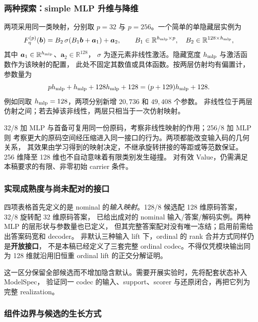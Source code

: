 \documentclass[11pt,UTF8,fontset=fandol]{ctexart}
\numberwithin{equation}{section}
\theoremstyle{definition}
\newcommand{\R}{\mathbb R}
\begin{document}
\subsubsection{两种探索：simple MLP 升维与降维}

两项采用同一类映射，分别取 $p=32$ 与 $p=256$。一个简单的单隐藏层实例为
\begin{equation}
 F_\eta^{(p)}(\bm b)=B_2\,\sigma(B_1\bm b+\bm a_1)+\bm a_2,
 \qquad
 B_1\in\R^{h_{\rm mlp}\times p},\quad
 B_2\in\R^{128\times h_{\rm mlp}},
 \label{eq:alt:categorical-mlp}
\end{equation}
其中 $\bm a_1\in\R^{h_{\rm mlp}}$、$\bm a_2\in\R^{128}$，
$\sigma$ 为逐元素非线性激活。隐藏宽度 $h_{\rm mlp}$ 与激活函数作为该映射的配置，
此处不固定其数值或具体函数。按两层仿射均有偏置计，参数量为
\begin{equation}
 p h_{\rm mlp}+h_{\rm mlp}+128h_{\rm mlp}+128
 =(p+129)h_{\rm mlp}+128.
 \label{eq:alt:categorical-mlp-parameters}
\end{equation}
例如同取 $h_{\rm mlp}=128$，两项分别新增 $20{,}736$ 和 $49{,}408$ 个参数。
非线性位于两层仿射之间；若去掉该非线性，两层只相当于一次仿射映射。

32/8 加 MLP 与首备可复用同一份原码，考察非线性映射的作用；256/8 加 MLP 则
考察更大的原码空间经压缩进入同一接口的行为。两项都能改变输入码的几何关系，
其效果由学习得到的映射决定，不继承旋转拼接的等距或等范数保证。
256 维降至 128 维也不自动意味着有限类别发生碰撞。
对有效 Value，仍需满足本稿要求的有限、非零初始 carrier 条件。

\subsubsection{实现成熟度与尚未配对的接口}
四项表格首先定义的是 nominal 的\emph{输入映射}。128/8 候选配 128 维原码答案，32/8 旋转配 32 维原码答案，
已给出成对的 nominal 输入/答案/解码实例。两种 MLP 的层形状与参数量也已定义，
但其完整答案配对没有唯一冻结；启用前需给出答案码宽和 decoder。
非默认三种输入 lift 下，ordinal 的 rank 合并方式同样仍是\textbf{开放接口}，
不是本稿已经定义了三套完整 ordinal codec。不得仅凭模块输出同为 128 维就沿用旧恒重 ordinal lift 的正交分解证明。

这一区分保留全部候选而不增加隐含默认。需要开展实验时，先将配套状态补入 ModelSpec，
验证同一 codec 的输入、support、scorer 与还原闭合，再把它列为完整 realization。

\subsubsection{组件边界与候选的生长方式}
\end{document}
